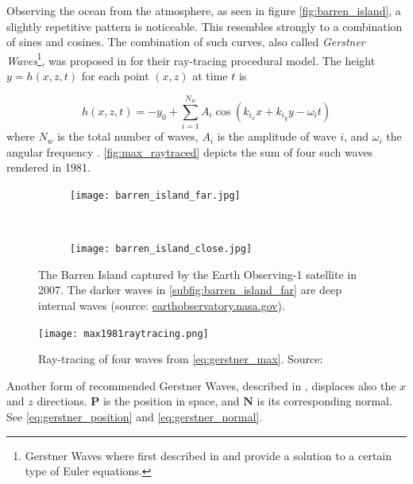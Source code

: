 Observing the ocean from the atmosphere, as seen in figure
\autoref{fig:barren_island}, a slightly repetitive pattern is noticeable. This
resembles strongly to a combination of sines and cosines. The combination of
such curves, also called \textit{Gerstner Waves}\footnote{Gerstner Waves where
    first described in \autocite{gerstner1802theorie} and provide a solution to
a certain type of Euler equations.}, was proposed in
\autocite{max1981vectorized} for their ray-tracing procedural model. The height
$y = h(x,z,t)$ for each point $(x,z)$ at time $t$ is

\begin{equation}\label{eq:gerstner_max}
    h(x, z, t) = -y_0 + \sum_{i = 1}^{N_w} A_i \cos(k_{i_x}x + k_{i_y}y -
    \omega_i t)
\end{equation}
%
where $N_w$ is the total number of waves, $A_i$ is the amplitude of wave $i$,
and $\omega_i$ the angular frequency
\autocite{max1981vectorized,darles2011survey}. \autoref{fig:max_raytraced}
depicts the sum of four such waves rendered in 1981.

\begin{figure}[h!]
    \centering
    \begin{subfigure}[h]{\textwidth}
        \centering
        \texttt{[image: barren\_island\_far.jpg]}
        \label{subfig:barren_island_far}
    \end{subfigure}\\%
    \begin{subfigure}[h]{\textwidth}
        \centering
        \texttt{[image: barren\_island\_close.jpg]}
        \label{subfig:barren_island_close}
    \end{subfigure}
    \caption{The Barren Island captured by the Earth Observing-1 satellite in
        2007. The darker waves in \autoref{subfig:barren_island_far} are
        deep internal waves (source:
        \url{earthobservatory.nasa.gov}).}\label{fig:barren_island}
\end{figure}

\begin{figure}[h]
    \centering
    \texttt{[image: max1981raytracing.png]}
    \caption{Ray-tracing of four waves from \autoref{eq:gerstner_max}. Source:
    \autocite{max1981vectorized}}\label{fig:max_raytraced}
\end{figure}

Another form of recommended Gerstner Waves, described in
\autocite[Chapter~1]{fernando2004gpu}, displaces also the $x$ and $z$
directions. $\textbf{P}$ is the position in space, and $\textbf{N}$ is its
corresponding normal. See \autoref{eq:gerstner_position} and
\autoref{eq:gerstner_normal}.

